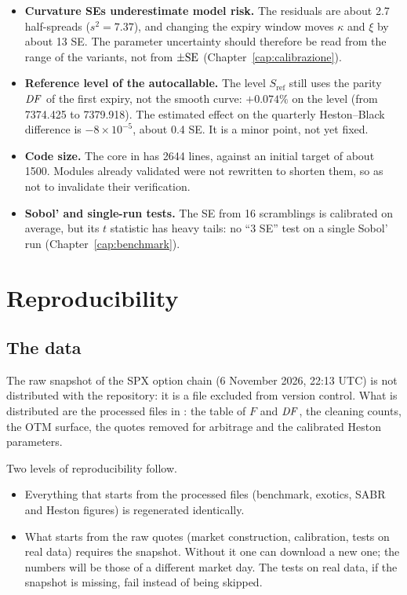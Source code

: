 \begin{itemize}
structural: the Heston skew does not grow enough as $T\to0$ (Section~\ref{sec:cal-skew}).
\item \textbf{Curvature SEs underestimate model risk.} The residuals are about 2.7 half-spreads ($s^2=7.37$), and
changing the expiry window moves $\kappa$ and $\xi$ by about 13 SE. The parameter uncertainty should therefore be read
from the range of the variants, not from $\pm\mathrm{SE}$ (Chapter~\ref{cap:calibrazione}).
\item \textbf{Reference level of the autocallable.} The level $S_{\text{ref}}$ still uses the parity $\mathit{DF}$ of the
first expiry, not the smooth curve: $+0.074\%$ on the level (from 7374.425 to 7379.918). The estimated effect on the
quarterly Heston--Black difference is $-8\times10^{-5}$, about 0.4 SE. It is a minor point, not yet fixed.
\item \textbf{Code size.} The core in  has 2644 lines, against an initial target of about 1500. Modules
already validated were not rewritten to shorten them, so as not to invalidate their verification.
\item \textbf{Sobol' and single-run tests.} The SE from 16 scramblings is calibrated on average, but its $t$ statistic
has heavy tails: no ``3 SE'' test on a single Sobol' run (Chapter~\ref{cap:benchmark}).
\end{itemize}

\section{Reproducibility}
\subsection{The data}
The raw snapshot of the SPX option chain (6 November 2026, 22:13 UTC) is not distributed with the repository: it is a
file excluded from version control. What is distributed are the processed files in : the table
of $F$ and $\mathit{DF}$, the cleaning counts, the OTM surface, the quotes removed for arbitrage and the calibrated Heston
parameters.

Two levels of reproducibility follow.
\begin{itemize}
\item Everything that starts from the processed files (benchmark, exotics, SABR and Heston figures) is regenerated
identically.
\item What starts from the raw quotes (market construction, calibration, tests on real data) requires the snapshot.
Without it one can download a new one; the numbers will be those of a different market day. The tests on real data,
if the snapshot is missing, fail instead of being skipped.
\end{itemize}

